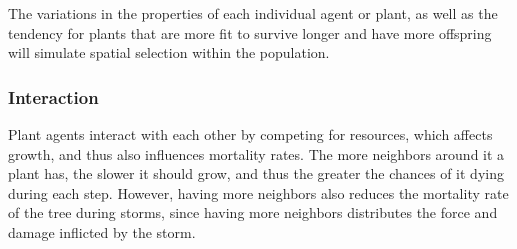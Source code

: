 The variations in the properties of each individual agent or plant, as
well as the tendency for plants that are more fit to survive longer and
have more offspring will simulate spatial selection within the
population.

\subsubsection{Interaction}
Plant agents interact with each other by competing for resources, which
affects growth, and thus also influences mortality rates. The more
neighbors around it a plant has, the slower it should grow, and thus the
greater the chances of it dying during each step. However, having more
neighbors also reduces the mortality rate of the tree during storms,
since having more neighbors distributes the force and damage inflicted
by the storm.
